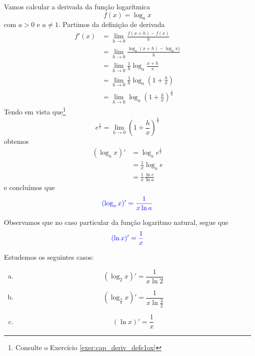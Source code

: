 Vamos calcular a derivada da função logarítmica
\begin{equation}
  f(x) = \log_a x
\end{equation}
com $a>0$ e $a\neq 1$. Partimos da definição de derivada
\begin{align}
  f'(x) &= \lim_{h\to 0}\frac{f(x+h)-f(x)}{h}\\
        &= \lim_{h\to 0}\frac{\log_a(x+h)-\log_ax)}{h}\\
        &= \lim_{h\to 0}\frac{1}{h}\log_a\frac{x+h}{x}\\
        &= \lim_{h\to 0}\frac{1}{h}\log_a\left(1 + \frac{h}{x}\right)\\
        &= \lim_{h\to 0}\log_a\left(1 + \frac{h}{x}\right)^{\frac{1}{h}}
\end{align}
Tendo em vista que\footnote{Consulte o Exercício \ref{exer:cap_deriv_defe1ox}}
\begin{equation}
  e^{\frac{1}{x}} = \lim_{h\to 0}\left(1 + \frac{h}{x}\right)^{\frac{1}{h}}
\end{equation}
obtemos
\begin{align}
  (\log_a x)' &= \log_a e^{\frac{1}{x}}\\
              &= \frac{1}{x}\log_a e\\
              &= \frac{1}{x}\frac{\ln e}{\ln a}
\end{align}
e concluímos que
\begin{equation}
  {\color{blue}(\log_a x)' = \frac{1}{x\ln a}}
\end{equation}

Observamos que no caso particular da função logaritmo natural, segue que
\begin{equation}
  {\color{blue}(\ln x)' = \frac{1}{x}}
\end{equation}

\begin{ex}
  Estudemos os seguintes casos:
  \begin{enumerate}[a)]
  \item
    \begin{equation}
      (\log_2 x)' = \frac{1}{x\ln 2}
    \end{equation}
  \item
    \begin{equation}
      \left(\log_{\frac{3}{2}}x\right)' = \frac{1}{x\ln \frac{3}{2}}
    \end{equation}
  \item
    \begin{equation}
      (\ln x)' = \frac{1}{x}
    \end{equation}
  \end{enumerate}
\end{ex}

